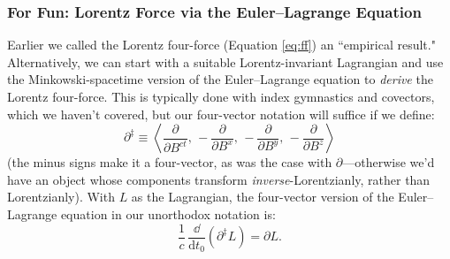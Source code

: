 \documentclass[12pt]{article}
\newcommand{\dd}[1]{\mathrm{d}#1}
\begin{document}
\subsubsection{For Fun: Lorentz Force via the Euler--Lagrange Equation}

Earlier we called the Lorentz four-force (Equation \ref{eq:ff}) an ``empirical result." Alternatively, we can start with a suitable Lorentz-invariant Lagrangian and use the Minkowski-spacetime version of the Euler--Lagrange equation to \emph{derive} the Lorentz four-force. This is typically done with index gymnastics and covectors, which we haven't covered, but our four-vector notation will suffice if we define:
\begin{equation*}
\partialup^\ddagger \equiv \left \langle \dfrac{\partial}{\partial B^{ct}} , \,  - \dfrac{\partial}{\partial B^x} , \, - \dfrac{\partial}{\partial B^y} , \, - \dfrac{\partial}{\partial B^z} \right \rangle
\end{equation*}
(the minus signs make it a four-vector, as was the case with $\partialup$---otherwise we'd have an object whose components transform \emph{inverse}-Lorentzianly, rather than Lorentzianly). With $L$ as the Lagrangian, the four-vector version of the Euler--Lagrange equation in our unorthodox notation is:
\begin{equation*}
\dfrac{1}{c} \, \dfrac{\dd}{\dd t_0} \left( \partialup^\ddagger L \right) = \partialup L .
\end{equation*}
\end{document}
